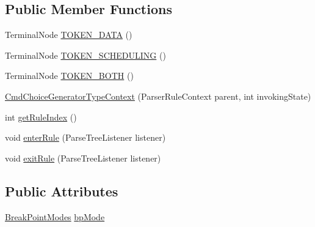 \subsection*{Public Member Functions}
\begin{DoxyCompactItemize}
\item 
Terminal\+Node \hyperlink{classgov_1_1nasa_1_1jpf_1_1inspector_1_1server_1_1expression_1_1parser_1_1_expression_grammar_pa25195f4046c6a14884faf2c870f5b76d_abbdd9c96a727f8188f1df3451e77e53c}{T\+O\+K\+E\+N\+\_\+\+D\+A\+TA} ()
\item 
Terminal\+Node \hyperlink{classgov_1_1nasa_1_1jpf_1_1inspector_1_1server_1_1expression_1_1parser_1_1_expression_grammar_pa25195f4046c6a14884faf2c870f5b76d_ab03411ccf0e44cd3c6a1b8706881f0be}{T\+O\+K\+E\+N\+\_\+\+S\+C\+H\+E\+D\+U\+L\+I\+NG} ()
\item 
Terminal\+Node \hyperlink{classgov_1_1nasa_1_1jpf_1_1inspector_1_1server_1_1expression_1_1parser_1_1_expression_grammar_pa25195f4046c6a14884faf2c870f5b76d_a0194fd7455c5856e31e561d6cbe2e731}{T\+O\+K\+E\+N\+\_\+\+B\+O\+TH} ()
\item 
\hyperlink{classgov_1_1nasa_1_1jpf_1_1inspector_1_1server_1_1expression_1_1parser_1_1_expression_grammar_pa25195f4046c6a14884faf2c870f5b76d_aa7c9a6240f69747863d6d76d08d4fd32}{Cmd\+Choice\+Generator\+Type\+Context} (Parser\+Rule\+Context parent, int invoking\+State)
\item 
int \hyperlink{classgov_1_1nasa_1_1jpf_1_1inspector_1_1server_1_1expression_1_1parser_1_1_expression_grammar_pa25195f4046c6a14884faf2c870f5b76d_a551633ba0630f0e04cde98b1bfbc9760}{get\+Rule\+Index} ()
\item 
void \hyperlink{classgov_1_1nasa_1_1jpf_1_1inspector_1_1server_1_1expression_1_1parser_1_1_expression_grammar_pa25195f4046c6a14884faf2c870f5b76d_aef163b6091df10de495fbaa10e89f56d}{enter\+Rule} (Parse\+Tree\+Listener listener)
\item 
void \hyperlink{classgov_1_1nasa_1_1jpf_1_1inspector_1_1server_1_1expression_1_1parser_1_1_expression_grammar_pa25195f4046c6a14884faf2c870f5b76d_a6fbc5fd9b208094ee25f60bae2cb20d3}{exit\+Rule} (Parse\+Tree\+Listener listener)
\end{DoxyCompactItemize}
\subsection*{Public Attributes}
\begin{DoxyCompactItemize}
\item 
\hyperlink{enumgov_1_1nasa_1_1jpf_1_1inspector_1_1server_1_1breakpoints_1_1_break_point_modes}{Break\+Point\+Modes} \hyperlink{classgov_1_1nasa_1_1jpf_1_1inspector_1_1server_1_1expression_1_1parser_1_1_expression_grammar_pa25195f4046c6a14884faf2c870f5b76d_ad311909f73e08a42946a5e9f4dab7ce8}{bp\+Mode}
\end{DoxyCompactItemize}


